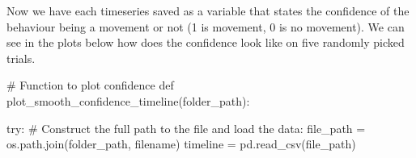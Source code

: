 \documentclass[
  letterpaper,
  DIV=11,
  numbers=noendperiod]{scrreprt}
\newenvironment{Shaded}{\begin{snugshade}}{\end{snugshade}}
\newcommand{\CommentTok}[1]{\textcolor[rgb]{0.37,0.37,0.37}{#1}}
\newcommand{\ControlFlowTok}[1]{\textcolor[rgb]{0.00,0.23,0.31}{#1}}
\newcommand{\KeywordTok}[1]{\textcolor[rgb]{0.00,0.23,0.31}{#1}}
\newcommand{\NormalTok}[1]{\textcolor[rgb]{0.00,0.23,0.31}{#1}}
\newcommand{\OperatorTok}[1]{\textcolor[rgb]{0.37,0.37,0.37}{#1}}
\begin{document}
Now we have each timeseries saved as a variable that states the
confidence of the behaviour being a movement or not (1 is movement, 0 is
no movement). We can see in the plots below how does the confidence look
like on five randomly picked trials.

\begin{Shaded}
\begin{Highlighting}[]
\CommentTok{\# Function to plot confidence}
\KeywordTok{def}\NormalTok{ plot\_smooth\_confidence\_timeline(folder\_path):}

    \ControlFlowTok{try}\NormalTok{:}
        \CommentTok{\# Construct the full path to the file and load the data:}
\NormalTok{        file\_path }\OperatorTok{=}\NormalTok{ os.path.join(folder\_path, filename)}
\NormalTok{        timeline }\OperatorTok{=}\NormalTok{ pd.read\_csv(file\_path)}


\end{Highlighting}
\end{Shaded}
\end{document}

